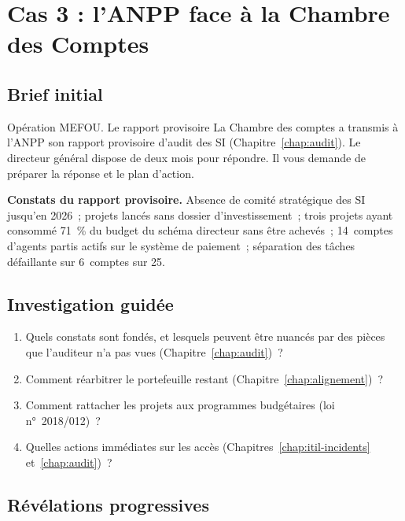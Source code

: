 \section{Cas 3 : l'ANPP face à la Chambre des Comptes}
\label{sec:c17-mefou}

\subsection{Brief initial}

\begin{boxscenario}{Opération MEFOU. Le rapport provisoire}
La Chambre des comptes a transmis à l'ANPP son rapport provisoire d'audit
des SI (Chapitre~\ref{chap:audit}). Le directeur général dispose de deux
mois pour répondre. Il vous demande de préparer la réponse et le plan
d'action.

\medskip
\textbf{Constats du rapport provisoire.} Absence de comité stratégique des
SI jusqu'en 2026~; projets lancés sans dossier d'investissement~; trois
projets ayant consommé 71~\% du budget du schéma directeur sans être
achevés~; 14~comptes d'agents partis actifs sur le système de paiement~;
séparation des tâches défaillante sur 6~comptes sur 25.
\end{boxscenario}

\subsection{Investigation guidée}

\begin{enumerate}
    \item Quels constats sont fondés, et lesquels peuvent être nuancés par
          des pièces que l'auditeur n'a pas vues (Chapitre~\ref{chap:audit})~?
    \item Comment réarbitrer le portefeuille restant (Chapitre~\ref{chap:alignement})~?
    \item Comment rattacher les projets aux programmes budgétaires
          (loi n°~2018/012)~?
    \item Quelles actions immédiates sur les accès (Chapitres~\ref{chap:itil-incidents}
          et~\ref{chap:audit})~?
\end{enumerate}

\subsection{Révélations progressives}

